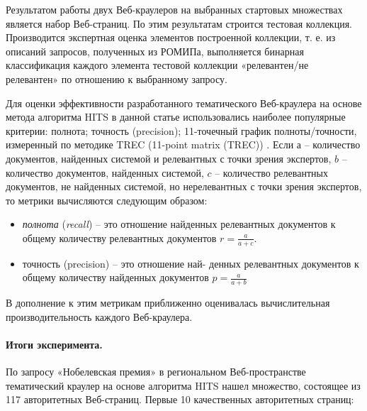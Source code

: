 Результатом работы двух Веб-краулеров на выбранных стартовых множествах является набор Веб-страниц. По этим результатам строится тестовая коллекция. Производится экспертная оценка элементов построенной коллекции, т. е. из описаний запросов, полученных из РОМИПа, выполняется бинарная классификация каждого элемента тестовой коллекции «релевантен/не релевантен» по отношению к выбранному запросу.

Для оценки эффективности разработанного тематического Веб-краулера на основе метода алгоритма HITS в данной статье использовались наиболее популярные критерии: полнота; точность (precision); 11-точечный график полноты/точности, измеренный по методике TREC (11-point matrix (TREC)) \cite{SmartEval,TREC2003,Zobel}. Если \(а\) -- количество документов, найденных системой и релевантных с точки зрения экспертов, \(b\) -- количество документов, найденных системой, \(c\) -- количество релевантных документов, не найденных системой, но нерелевантных с точки зрения экспертов, то метрики вычисляются следующим образом:

\begin{itemize}
	\item \textit{полнота} (\textit{recall}) -- это отношение найденных релевантных документов к общему количеству релевантных документов \(r = \frac{a}{a + c}\).
	\item точность (precision) – это отношение най- денных релевантных документов к общему количеству найденных документов \(p = \frac{a}{a + b}\)
\end{itemize}

В дополнение к этим метрикам приближенно оценивалась вычислительная производительность каждого Веб-краулера.

\paragraph{Итоги эксперимента.} По запросу «Нобелевская премия» в региональном Веб-пространстве тематический краулер на основе алгоритма HITS нашел множество, состоящее из 117 авторитетных Веб-страниц. Первые 10 качественных авторитетных страниц:

